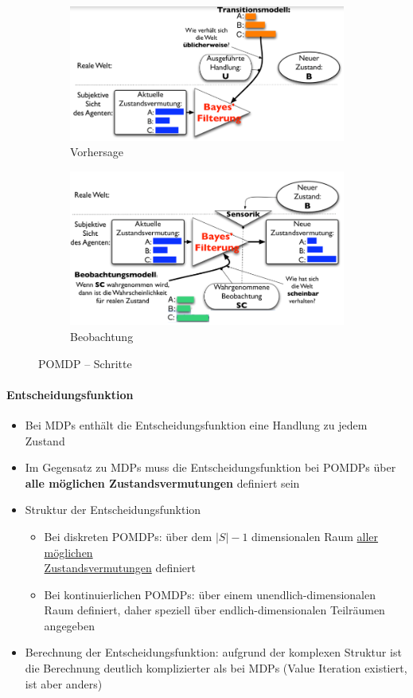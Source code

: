 \begin{figure}[!ht]
\begin{subfigure}{.5\textwidth}
		\includegraphics[width=\textwidth]{figures/ch08_pom3.png}
		\caption{Vorhersage}
	\end{subfigure}
	\begin{subfigure}{.5\textwidth}
		\includegraphics[width=\textwidth]{figures/ch08_pom4.png}
		\caption{Beobachtung}
	\end{subfigure}
	\caption{POMDP -- Schritte}
	\label{pom}
\end{figure}

\paragraph{Entscheidungsfunktion}
\begin{itemize}
	\item Bei MDPs enth\"alt die Entscheidungsfunktion eine Handlung zu jedem Zustand
	\item Im Gegensatz zu MDPs muss die Entscheidungsfunktion bei POMDPs \"uber \textbf{alle m\"oglichen Zustandsvermutungen} definiert sein
	\item Struktur der Entscheidungsfunktion
	\begin{itemize}
		\item Bei diskreten POMDPs: \"uber dem $|S|-1$ dimensionalen Raum \underline{aller m\"oglichen}\\ \underline{Zustandsvermutungen} definiert
		\item Bei kontinuierlichen POMDPs: \"uber einem unendlich-dimensionalen Raum definiert, daher speziell \"uber endlich-dimensionalen Teilr\"aumen angegeben
	\end{itemize}
	\item Berechnung der Entscheidungsfunktion: aufgrund der komplexen Struktur ist die Berechnung deutlich komplizierter als bei MDPs (Value Iteration existiert, ist aber anders)
\end{itemize}

